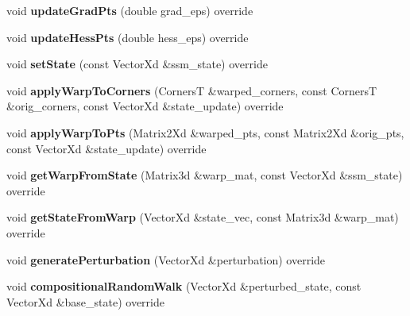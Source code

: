\begin{DoxyCompactItemize}
\item 
\hypertarget{classAffine_a1930e8a44e6541bef0f14f11ba535ee4}{void {\bfseries update\-Grad\-Pts} (double grad\-\_\-eps) override}\label{classAffine_a1930e8a44e6541bef0f14f11ba535ee4}

\item 
\hypertarget{classAffine_ae4cca8d0810e7d6c328a64df011c7b52}{void {\bfseries update\-Hess\-Pts} (double hess\-\_\-eps) override}\label{classAffine_ae4cca8d0810e7d6c328a64df011c7b52}

\item 
\hypertarget{classAffine_af1c117db413f5dc5896b9dfe137d5eda}{void {\bfseries set\-State} (const Vector\-Xd \&ssm\-\_\-state) override}\label{classAffine_af1c117db413f5dc5896b9dfe137d5eda}

\item 
\hypertarget{classAffine_ac1dea6ab2e5acfcc50c5fc1ea4a99c12}{void {\bfseries apply\-Warp\-To\-Corners} (Corners\-T \&warped\-\_\-corners, const Corners\-T \&orig\-\_\-corners, const Vector\-Xd \&state\-\_\-update) override}\label{classAffine_ac1dea6ab2e5acfcc50c5fc1ea4a99c12}

\item 
\hypertarget{classAffine_a1012a305b4a5f99447ea6bb7943377b9}{void {\bfseries apply\-Warp\-To\-Pts} (Matrix2\-Xd \&warped\-\_\-pts, const Matrix2\-Xd \&orig\-\_\-pts, const Vector\-Xd \&state\-\_\-update) override}\label{classAffine_a1012a305b4a5f99447ea6bb7943377b9}

\item 
\hypertarget{classAffine_af05041f4ee272cfcbec298f2b1d51b07}{void {\bfseries get\-Warp\-From\-State} (Matrix3d \&warp\-\_\-mat, const Vector\-Xd \&ssm\-\_\-state) override}\label{classAffine_af05041f4ee272cfcbec298f2b1d51b07}

\item 
\hypertarget{classAffine_aeb9e78b2f013ffa81bee8f928a97457f}{void {\bfseries get\-State\-From\-Warp} (Vector\-Xd \&state\-\_\-vec, const Matrix3d \&warp\-\_\-mat) override}\label{classAffine_aeb9e78b2f013ffa81bee8f928a97457f}

\item 
\hypertarget{classAffine_ad7e68a462deb51a5e0505c52c9c6fa52}{void {\bfseries generate\-Perturbation} (Vector\-Xd \&perturbation) override}\label{classAffine_ad7e68a462deb51a5e0505c52c9c6fa52}

\item 
\hypertarget{classAffine_a7bb7dc4edd20137486cf827d271bdca8}{void {\bfseries compositional\-Random\-Walk} (Vector\-Xd \&perturbed\-\_\-state, const Vector\-Xd \&base\-\_\-state) override}\label{classAffine_a7bb7dc4edd20137486cf827d271bdca8}


\end{DoxyCompactItemize}
